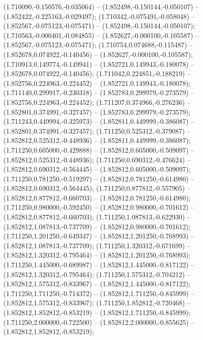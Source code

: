  (1.710090,-0.150576,-0.035064) -- (1.852498,-0.150144,-0.050107) -- (1.852422,-0.225163,-0.029497);
 (1.710342,-0.075491,-0.058048) -- (1.852567,-0.075123,-0.075471) -- (1.852498,-0.150144,-0.050107);
 (1.710563,-0.000401,-0.084855) -- (1.852627,-0.000100,-0.105587) -- (1.852567,-0.075123,-0.075471);
 (1.710754,0.074688,-0.115487) -- (1.852678,0.074922,-0.140456) -- (1.852627,-0.000100,-0.105587);
 (1.710913,0.149774,-0.149941) -- (1.852721,0.149943,-0.180078) -- (1.852678,0.074922,-0.140456);
 (1.711042,0.224851,-0.188219) -- (1.852756,0.224963,-0.224452) -- (1.852721,0.149943,-0.180078);
 (1.711140,0.299917,-0.230318) -- (1.852783,0.299979,-0.273579) -- (1.852756,0.224963,-0.224452);
 (1.711207,0.374966,-0.276236) -- (1.852801,0.374991,-0.327457) -- (1.852783,0.299979,-0.273579);
 (1.711243,0.449994,-0.325973) -- (1.852811,0.449999,-0.386087) -- (1.852801,0.374991,-0.327457);
 (1.711250,0.525312,-0.379087) -- (1.852812,0.525312,-0.448936) -- (1.852811,0.449999,-0.386087);
 (1.711250,0.605000,-0.429888) -- (1.852812,0.605000,-0.509097) -- (1.852812,0.525312,-0.448936);
 (1.711250,0.690312,-0.476624) -- (1.852812,0.690312,-0.564445) -- (1.852812,0.605000,-0.509097);
 (1.711250,0.781250,-0.519297) -- (1.852812,0.781250,-0.614980) -- (1.852812,0.690312,-0.564445);
 (1.711250,0.877812,-0.557905) -- (1.852812,0.877812,-0.660703) -- (1.852812,0.781250,-0.614980);
 (1.711250,0.980000,-0.592450) -- (1.852812,0.980000,-0.701612) -- (1.852812,0.877812,-0.660703);
 (1.711250,1.087813,-0.622930) -- (1.852812,1.087813,-0.737709) -- (1.852812,0.980000,-0.701612);
 (1.711250,1.201250,-0.649347) -- (1.852812,1.201250,-0.768993) -- (1.852812,1.087813,-0.737709);
 (1.711250,1.320312,-0.671699) -- (1.852812,1.320312,-0.795464) -- (1.852812,1.201250,-0.768993);
 (1.711250,1.445000,-0.689987) -- (1.852812,1.445000,-0.817122) -- (1.852812,1.320312,-0.795464);
 (1.711250,1.575312,-0.704212) -- (1.852812,1.575312,-0.833967) -- (1.852812,1.445000,-0.817122);
 (1.711250,1.711250,-0.714372) -- (1.852812,1.711250,-0.845999) -- (1.852812,1.575312,-0.833967);
 (1.711250,1.852812,-0.720468) -- (1.852812,1.852812,-0.853219) -- (1.852812,1.711250,-0.845999);
 (1.711250,2.000000,-0.722500) -- (1.852812,2.000000,-0.855625) -- (1.852812,1.852812,-0.853219);
